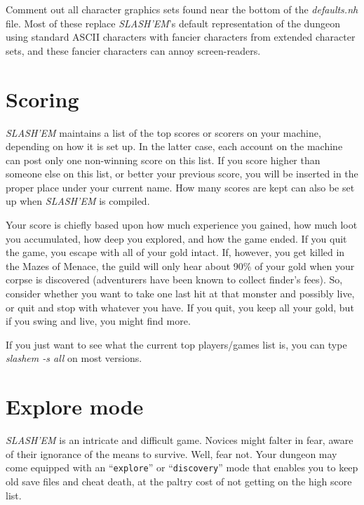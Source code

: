 \item[\ib{Character graphics}]
Comment out all character graphics sets found near the bottom of the
{\it defaults.nh\/} file.  Most of these replace {\it {\it SLASH'EM\/}\/}'s
default representation of the dungeon using standard ASCII characters
with fancier characters from extended character sets, and these fancier
characters can annoy screen-readers.
\elist
\nd %
\section{Scoring}


{\it SLASH'EM\/} maintains a list of the top scores or scorers on your machine,
depending on how it is set up.  In the latter case, each account on
the machine can post only one non-winning score on this list.  If
you score higher than someone else on this list, or better your
previous score, you will be inserted in the proper place under your
current name.  How many scores are kept can also be set up when
{\it SLASH'EM\/} is compiled.

Your score is chiefly based upon how much experience you gained, how
much loot you accumulated, how deep you explored, and how the game
ended.  If you quit the game, you escape with all of your gold intact.
If, however, you get killed in the Mazes of Menace, the guild will
only hear about 90\% of your gold when your corpse is discovered
(adventurers have been known to collect finder's fees).  So, consider
whether you want to take one last hit at that monster and possibly
live, or quit and stop with whatever you have.  If you quit, you keep
all your gold, but if you swing and live, you might find more.

If you just want to see what the current top players/games list is, you
can type {\it slashem -s all\/} on most versions.

\section{Explore mode}


{\it SLASH'EM\/} is an intricate and difficult game.  Novices might falter
in fear, aware of their ignorance of the means to survive.  Well, fear
not.  Your dungeon may come equipped with an ``{\tt explore}'' or ``{\tt discovery}''
mode that enables you to keep old save files and cheat death, at the
paltry cost of not getting on the high score list.

